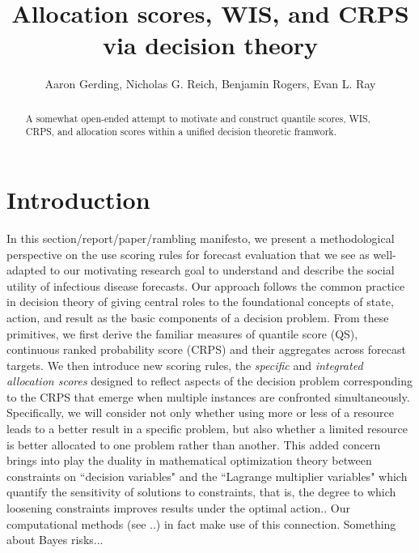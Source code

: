 \documentclass{article}
\title{Allocation scores, WIS, and CRPS via decision theory}
\author{Aaron Gerding, Nicholas G. Reich, Benjamin Rogers, Evan L. Ray}
\begin{document}
\newcommand{\del}[2]{\frac{\partial {#1} }{\partial {#2}} }
\newcommand{\dby}[2]{\frac{d {#1} }{d {#2}} }
\newcommand{\sbar}{\overline{s}}
\newtheorem{proposition}{Proposition}

\theoremstyle{remark}
\newtheorem*{remark}{Remark}

\maketitle

\begin{abstract}

A somewhat open-ended attempt to motivate and construct quantile scores, WIS, CRPS, and allocation scores within a unified decision theoretic framwork.

\end{abstract}

\section{Introduction}

In this section/report/paper/rambling manifesto, we present a methodological perspective on the use scoring rules for forecast evaluation that we see as well-adapted to our motivating research goal to understand and describe the social utility of infectious disease forecasts. Our approach follows the common practice in decision theory of giving central roles to the foundational concepts of state, action, and result as the basic components of a decision problem. From these primitives, we first derive the familiar measures of quantile score (QS), continuous ranked probability score (CRPS) and their aggregates across forecast targets.  We then introduce new scoring rules, the \emph{specific} and \emph{integrated allocation scores} designed to reflect aspects of the decision problem corresponding to the CRPS that emerge when multiple instances are confronted simultaneously.  Specifically, we will consider not only whether using more or less of a resource leads to a better result in a specific problem, but also whether a limited resource is better allocated to one problem rather than another.
This added concern brings into play the duality in mathematical optimization theory between constraints on ``decision variables" and the ``Lagrange multiplier variables" which quantify the sensitivity of solutions to constraints, that is, the degree to which loosening constraints improves results under the optimal action..
Our computational methods (see ..) in fact make use of this connection.
Something about Bayes risks...
\end{document}

